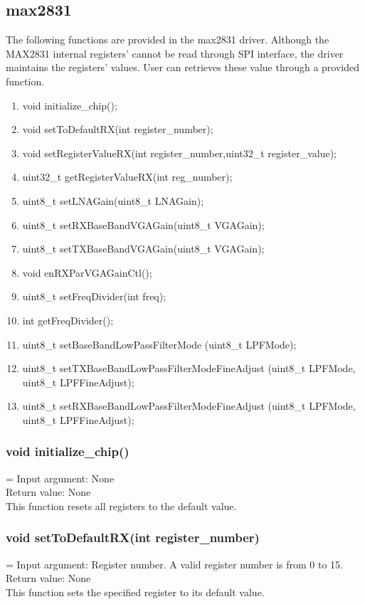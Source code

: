 \subsection{max2831}
The following functions are provided in the max2831 driver. Although the MAX2831 internal registers'
cannot be read through SPI interface, the driver maintains the registers' values. User can retrieves
these value through a provided function.

\begin{enumerate}
	\item void initialize\_chip();
	\item void setToDefaultRX(int register\_number);
	\item void setRegisterValueRX(int register\_number,uint32\_t register\_value);
	\item uint32\_t getRegisterValueRX(int reg\_number);
	\item uint8\_t setLNAGain(uint8\_t LNAGain);
	\item uint8\_t setRXBaseBandVGAGain(uint8\_t VGAGain);
	\item uint8\_t setTXBaseBandVGAGain(uint8\_t VGAGain);
	\item void enRXParVGAGainCtl();
	\item uint8\_t setFreqDivider(int freq);
	\item int getFreqDivider();
	\item uint8\_t setBaseBandLowPassFilterMode (uint8\_t LPFMode);
	\item uint8\_t setTXBaseBandLowPassFilterModeFineAdjust (uint8\_t LPFMode, uint8\_t LPFFineAdjust);
	\item uint8\_t setRXBaseBandLowPassFilterModeFineAdjust (uint8\_t LPFMode, uint8\_t LPFFineAdjust);
\end{enumerate}

\subsubsection{void initialize\_chip()}
\hangindent=\parindent
{}
Input argument: None\\
Return value: None\\
This function resets all registers to the default value.

\subsubsection{void setToDefaultRX(int register\_number)}
\hangindent=\parindent
{}
Input argument: Register number. A valid register number is from 0 to 15.\\
Return value: None\\
This function sets the specified register to its default value.

